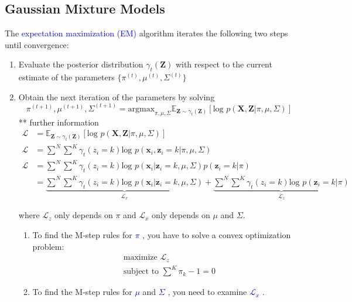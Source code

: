 \documentclass[a4paper,10pt,twoside=true,DIV=10,headsepline,plainheadsepline]{scrartcl}
\begin{document}
		\subsection{Gaussian Mixture Models}

		The \textcolor{blue}{expectation maximization (EM)} algorithm iterates the following two steps until convergence:

		\begin{enumerate}
			\item Evaluate the posterior distribution $\gamma_t (\mathbf{Z})$ with respect to the current estimate of the parameters $ \{\pi^{(t)}, \mu^{(t)}, \Sigma^{(t)} \} $
			\item Obtain the next iteration of the parameters by solving
			\begin{equation} 
				\pi^{(t+1)}, \mu^{(t+1)}, \Sigma^{(t+1)} = \textrm{argmax}_{\pi, \mu, \Sigma}  \textrm{} \mathbb{E}_{\mathbf{Z} \sim \gamma_t \textrm{} (\mathbf{Z})} [\textrm{log }p(\mathbf{X},\mathbf{Z} | \pi, \mu, \Sigma)]
			\end{equation}
			** further information
			\begin{align} 
				\mathcal{L} &= \mathbb{E}_{\mathbf{Z} \sim \gamma_t \textrm{} (\mathbf{Z})} [\textrm{log }p(\mathbf{X},\mathbf{Z} | \pi, \mu, \Sigma)] \\
				\mathcal{L} &= \sum^N \sum^K \gamma_t (z_i = k) \textrm{log } p(\mathbf{x}_i,\mathbf{z}_i = k | \pi, \mu, \Sigma) \\
				\mathcal{L} &= \sum^N \sum^K \gamma_t (z_i = k) \textrm{log } p(\mathbf{x}_i | \mathbf{z}_i = k, \mu, \Sigma) p(\mathbf{z}_i = k | \pi) \\
				&= \underbrace{\sum^N \sum^K \gamma_t (z_i = k) \textrm{log } p(\mathbf{x}_i | \mathbf{z}_i = k, \mu, \Sigma)}_{\mathcal{L}_x} + \underbrace{\sum^N \sum^K \gamma_t (z_i = k) \textrm{log } p(\mathbf{z}_i = k | \pi)}_{\mathcal{L}_z}
			\end{align}

			where $\mathcal{L}_z$ only depends on $\pi$ and $\mathcal{L}_x$ only depends on $\mu$ and $\Sigma$.
			\newline

			\begin{enumerate}
				\item To find the M-step rules for \textcolor{blue}{ $\pi$  }, you have to solve a convex optimization problem:
				\begin{align}
					&\textrm{maximize } \mathcal{L}_z \\
					&\textrm{subject to } \sum^K \pi_k - 1 = 0
				\end{align}
				\item To find the M-step rules for \textcolor{blue}{ $\mu$ }and \textcolor{blue}{ $\Sigma$ }, you need to examine \textcolor{blue}{ $\mathcal{L}_x$ }.
			\end{enumerate}
		\end{enumerate}
			
\end{document}
